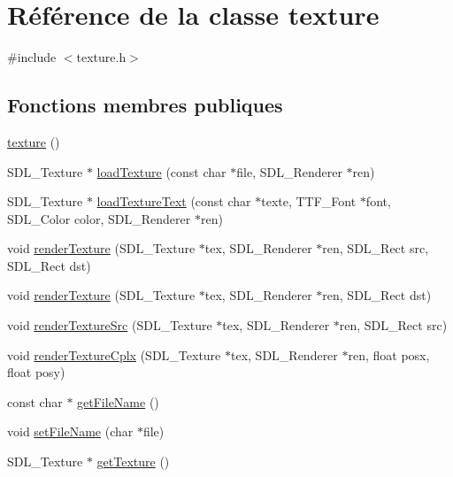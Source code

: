 \hypertarget{classtexture}{}\section{Référence de la classe texture}
\label{classtexture}


{\ttfamily \#include $<$texture.\+h$>$}

\subsection*{Fonctions membres publiques}
\begin{DoxyCompactItemize}
\item 
\hyperlink{classtexture_a67c03ae3cb8184199ab3127ce0f610c0}{texture} ()
\item 
S\+D\+L\+\_\+\+Texture $\ast$ \hyperlink{classtexture_a49ede423748f70640d15828b7012e8a4}{load\+Texture} (const char $\ast$file, S\+D\+L\+\_\+\+Renderer $\ast$ren)
\item 
S\+D\+L\+\_\+\+Texture $\ast$ \hyperlink{classtexture_aaae5f9909a7a221b77f3a20a7f4f45ee}{load\+Texture\+Text} (const char $\ast$texte, T\+T\+F\+\_\+\+Font $\ast$font, S\+D\+L\+\_\+\+Color color, S\+D\+L\+\_\+\+Renderer $\ast$ren)
\item 
void \hyperlink{classtexture_a6488137004fa3cae90ae70a3e1ccb5d7}{render\+Texture} (S\+D\+L\+\_\+\+Texture $\ast$tex, S\+D\+L\+\_\+\+Renderer $\ast$ren, S\+D\+L\+\_\+\+Rect src, S\+D\+L\+\_\+\+Rect dst)
\item 
void \hyperlink{classtexture_a0d68b4cace4e1d4269661f9a7aa89b22}{render\+Texture} (S\+D\+L\+\_\+\+Texture $\ast$tex, S\+D\+L\+\_\+\+Renderer $\ast$ren, S\+D\+L\+\_\+\+Rect dst)
\item 
void \hyperlink{classtexture_abda16deb5c6c4b90c0e8bcc8a04d8460}{render\+Texture\+Src} (S\+D\+L\+\_\+\+Texture $\ast$tex, S\+D\+L\+\_\+\+Renderer $\ast$ren, S\+D\+L\+\_\+\+Rect src)
\item 
void \hyperlink{classtexture_ada440ad92026f4633c1218338331abc3}{render\+Texture\+Cplx} (S\+D\+L\+\_\+\+Texture $\ast$tex, S\+D\+L\+\_\+\+Renderer $\ast$ren, float posx, float posy)
\item 
const char $\ast$ \hyperlink{classtexture_a62334e3f7ba2b06e2dfb6a3164d0c78f}{get\+File\+Name} ()
\item 
void \hyperlink{classtexture_a698e15e3134bace49770ce6b8852b79a}{set\+File\+Name} (char $\ast$file)
\item 
S\+D\+L\+\_\+\+Texture $\ast$ \hyperlink{classtexture_a60cbac4b525e01409b37f81a1df8eff4}{get\+Texture} ()

\end{DoxyCompactItemize}
